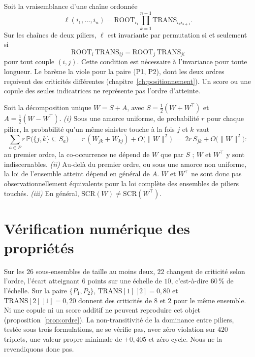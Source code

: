 \begin{proposition}
\label{prop:ordre}
Soit la vraisemblance d'une chaîne ordonnée
\[
\ell(i_1,\dots,i_n)=\mathrm{ROOT}_{i_1}\prod_{k=1}^{n-1}\mathrm{TRANS}_{i_k i_{k+1}}.
\]
Sur les chaînes de deux piliers, $\ell$ est invariante par
permutation si et seulement si
\[
\mathrm{ROOT}_i\,\mathrm{TRANS}_{ij}=\mathrm{ROOT}_j\,\mathrm{TRANS}_{ji}
\]
pour tout couple $(i,j)$. Cette condition est nécessaire à l'invariance pour toute longueur. Le barème la viole pour la paire (P1, P2), dont les deux ordres reçoivent des criticités différentes (chapitre~\ref{ch:positionnement}). Un score ou une copule des seules indicatrices ne représente pas l'ordre d'atteinte.
\end{proposition}

\begin{proposition}
\label{prop:nonid}
Soit la décomposition unique $W=S+A$, avec $S=\tfrac12(W+W^\top)$ et $A=\tfrac12(W-W^\top)$.
\emph{(i)} Sous une amorce uniforme, de probabilité $r$ pour chaque pilier, la probabilité qu'un
même sinistre touche à la fois $j$ et $k$ vaut
\[
  \sum_{a\in P} r\,\mathbb P\bigl(\{j,k\}\subseteq S_a\bigr)
  \;=\; r\,(W_{jk}+W_{kj})+O\bigl(\lVert W\rVert^2\bigr)
  \;=\; 2r\,S_{jk}+O\bigl(\lVert W\rVert^2\bigr) :
\]
au premier ordre, la co-occurrence ne dépend de $W$ que par $S$ ; $W$ et $W^\top$ y sont
indiscernables. \emph{(ii)} Au-delà du premier ordre, ou sous une amorce non uniforme, la loi de
l'ensemble atteint dépend en général de $A$. $W$ et $W^\top$ ne sont donc pas observationnellement
équivalents pour la loi complète des ensembles de piliers touchés. \emph{(iii)} En général,
$\mathrm{SCR}(W)\neq\mathrm{SCR}(W^\top)$.
\end{proposition}


\section{Vérification numérique des propriétés}
\label{sec:verif-proprietes}

Sur les $26$ sous-ensembles de taille au moins deux, $22$ changent de criticité selon l'ordre,
l'écart atteignant $6$ points sur une échelle de $10$, c'est-à-dire $60\,\%$ de l'échelle. Sur la
paire $\{P_1,P_2\}$, $\mathrm{TRANS}[1][2]=0{,}80$ et $\mathrm{TRANS}[2][1]=0{,}20$ donnent des
criticités de $8$ et $2$ pour le même ensemble. Ni une copule ni un score additif ne peuvent
reproduire cet objet (proposition~\ref{prop:ordre}). La
non-transitivité de la dominance entre piliers, testée sous trois formulations, ne se vérifie pas,
avec zéro violation sur $420$ triplets, une valeur propre minimale de $+0{,}405$ et zéro cycle.
Nous ne la revendiquons donc pas.

